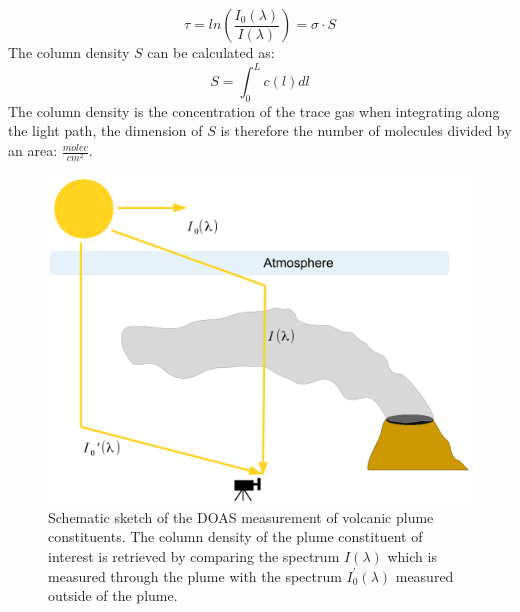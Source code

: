 \documentclass  [
  paper    = a4,
  BCOR     = 10mm,
  twoside,
  fontsize = 12pt,
  fleqn,
  toc      = bibnumbered,
  toc      = listofnumbered,
  numbers  = noendperiod,
  headings = normal,
  listof   = leveldown,
  version  = 3.03
]                                       {scrreprt}
\begin{document}
	\begin{equation}
	\tau = ln\left(\frac{I_{0}\left(\lambda\right)}{I\left(\lambda\right)}\right) = \sigma\cdot S
	\end{equation}
	The column density $S$ can be calculated as:
	\begin{equation}
	S = \int_{0}^{L}c\left(l\right)dl
	\end{equation}
	The column density is the concentration of the trace gas when integrating along the light path, the dimension of $S$ is therefore the number of molecules divided by an area: $\frac{molec}{cm^2}$.\\
	\begin{figure}
		\centering
		\includegraphics[width=0.7\linewidth]{Bilder/DOASFunction}
		\caption{Schematic sketch of the DOAS measurement of volcanic plume constituents. The column density of the plume constituent of interest is retrieved by comparing the spectrum $I\left(\lambda \right)$ which is measured through the plume with the spectrum  $I_0^{'}\left(\lambda \right)$ measured outside of the plume.}
		\label{fig:doasfunction}
	\end{figure}
	
\end{document}
